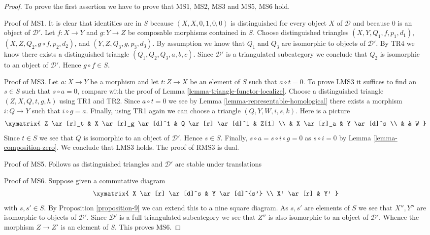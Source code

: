\begin{proof}
To prove the first assertion we have to prove that
MS1, MS2, MS3 and MS5, MS6 hold.

\medskip\noindent
Proof of MS1. It is clear that identities are in $S$ because
$(X, X, 0, 1, 0, 0)$ is distinguished for every object $X$ of $\mathcal{D}$
and because $0$ is an object of $\mathcal{D}'$. Let $f : X \to Y$
and $g : Y \to Z$ be composable morphisms contained in $S$.
Choose distinguished triangles $(X, Y, Q_1, f, p_1, d_1)$,
$(X, Z, Q_2, g \circ f, p_2, d_2)$, and $(Y, Z, Q_3, g, p_3, d_3)$.
By assumption we know that $Q_1$ and $Q_3$ are isomorphic to objects
of $\mathcal{D}'$. By TR4 we know there exists a distinguished
triangle $(Q_1, Q_2, Q_3, a, b, c)$. Since $\mathcal{D}'$ is a
triangulated subcategory we conclude that $Q_2$ is isomorphic to
an object of $\mathcal{D}'$. Hence $g \circ f \in S$.

\medskip\noindent
Proof of MS3. Let $a : X \to Y$ be a morphism and let $t : Z \to X$ be
an element of $S$ such that $a \circ t = 0$. To prove LMS3 it suffices to
find an $s \in S$ such that $s \circ a = 0$, compare with the proof of
Lemma \ref{lemma-triangle-functor-localize}. Choose a distinguished
triangle $(Z, X, Q, t, g, h)$ using TR1 and TR2. Since $a \circ t = 0$
we see by
Lemma \ref{lemma-representable-homological}
there exists a morphism $i : Q \to Y$ such that $i \circ g = a$.
Finally, using TR1 again we can choose a triangle
$(Q, Y, W, i, s, k)$. Here is a picture
$$
\xymatrix{
Z \ar[r]_t & X \ar[r]_g \ar[d]^1 & Q \ar[r] \ar[d]^i & Z[1] \\
& X \ar[r]_a & Y \ar[d]^s \\
& & W
}
$$
Since $t \in S$ we see that $Q$ is isomorphic to an object of $\mathcal{D}'$.
Hence $s \in S$. Finally, $s \circ a = s \circ i \circ g = 0$ as
$s \circ i = 0$ by Lemma \ref{lemma-composition-zero}.
We conclude that LMS3 holds.
The proof of RMS3 is dual.

\medskip\noindent
Proof of MS5. Follows as distinguished triangles and $\mathcal{D}'$
are stable under translations

\medskip\noindent
Proof of MS6. Suppose given a commutative diagram
$$
\xymatrix{
X \ar[r] \ar[d]^s &
Y \ar[d]^{s'} \\
X' \ar[r] &
Y'
}
$$
with $s, s' \in S$. By
Proposition \ref{proposition-9}
we can extend this to a nine square diagram. As $s, s'$ are elements of $S$
we see that $X'', Y''$ are isomorphic to objects of $\mathcal{D}'$.
Since $\mathcal{D}'$ is a full triangulated subcategory we see that
$Z''$ is also isomorphic to an object of $\mathcal{D}'$.
Whence the morphism $Z \to Z'$
is an element of $S$. This proves MS6.


\end{proof}
